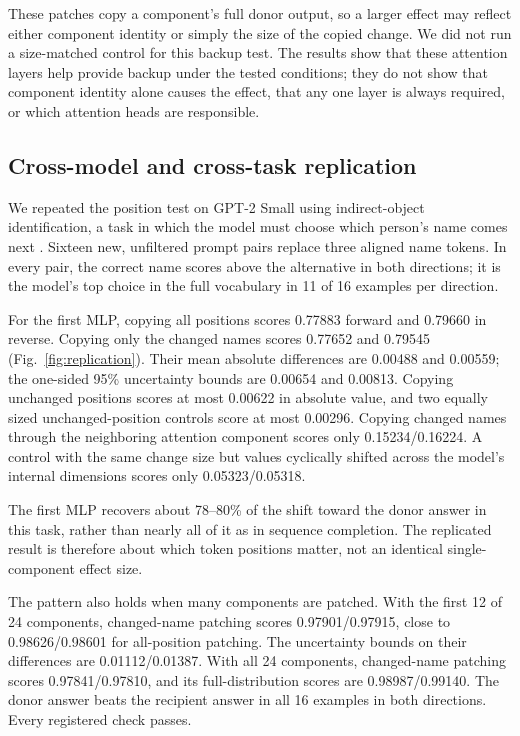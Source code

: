 \documentclass[pdflatex,sn-nature]{sn-jnl}
\begin{document}
These patches copy a component's full donor output, so a larger effect may
reflect either component identity or simply the size of the copied change. We
did not run a size-matched control for this backup test. The results show that
these attention layers help provide backup under the tested conditions; they
do not show that component identity alone causes the effect, that any one
layer is always required, or which attention heads are responsible.

\subsection{Cross-model and cross-task replication}\label{sec:replication}

We repeated the position test on GPT-2 Small using indirect-object
identification, a task in which the model must choose which person's name
comes next \citep{wang2022ioi}. Sixteen new, unfiltered prompt pairs replace
three aligned name tokens. In every pair, the correct name scores above the
alternative in both directions; it is the model's top choice in the full
vocabulary in 11 of 16 examples per direction.

For the first MLP, copying all positions scores 0.77883 forward and 0.79660 in
reverse. Copying only the changed names scores 0.77652 and 0.79545
(Fig.~\ref{fig:replication}). Their mean absolute differences are 0.00488 and
0.00559; the one-sided 95\% uncertainty bounds are 0.00654 and 0.00813.
Copying unchanged positions scores at most 0.00622 in absolute value, and two
equally sized unchanged-position controls score at most 0.00296. Copying
changed names through the neighboring attention component scores only
0.15234/0.16224. A control with the same change size but values cyclically
shifted across the model's internal dimensions scores only 0.05323/0.05318.

The first MLP recovers about 78--80\% of the shift toward the donor answer in
this task, rather than nearly all of it as in sequence completion. The
replicated result is therefore about which token positions matter, not an
identical single-component effect size.

The pattern also holds when many components are patched. With the first 12 of
24 components, changed-name patching scores 0.97901/0.97915, close to
0.98626/0.98601 for all-position patching. The uncertainty bounds on their
differences are 0.01112/0.01387. With all 24 components, changed-name patching
scores 0.97841/0.97810, and its full-distribution scores are 0.98987/0.99140.
The donor answer beats the recipient answer in all 16 examples in both
directions. Every registered check passes.
\end{document}
